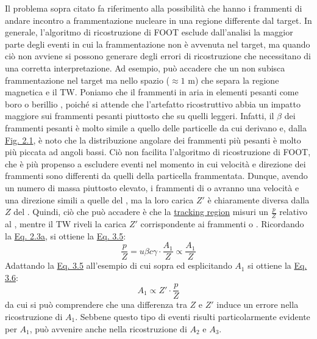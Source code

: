 \documentclass[12pt,a4paper,twoside]{report}
\begin{document}
	Il problema sopra citato fa riferimento alla possibilità che hanno i frammenti di andare incontro a frammentazione nucleare in una regione differente dal target. In generale, l'algoritmo di ricostruzione di FOOT esclude dall'analisi la maggior parte degli eventi in cui la frammentazione non è avvenuta nel target, ma quando ciò non avviene si possono generare degli errori di ricostruzione che necessitano di una corretta interpretazione. Ad esempio, può accadere che un  non subisca frammentazione nel target ma nello spazio ($\approx1\mbox{ m}$) che separa la regione magnetica e il TW. Poniamo che il  frammenti in aria in elementi pesanti come boro  o berillio , poiché si attende che l'artefatto ricostruttivo abbia un impatto maggiore sui frammenti pesanti piuttosto che su quelli leggeri. Infatti, il $\beta$ dei frammenti pesanti è molto simile a quello delle particelle da cui derivano e, dalla \hyperref[fig:angular]{Fig. 2.1}, è noto che la distribuzione angolare dei frammenti più pesanti è molto più piccata ad angoli bassi. Ciò non facilita l'algoritmo di ricostruzione di FOOT, che è più propenso a escludere eventi nel momento in cui velocità e direzione dei frammenti sono differenti da quelli della particella frammentata. Dunque, avendo un numero di massa piuttosto elevato, i frammenti di  o  avranno una velocità e una direzione simili a quelle del , ma la loro carica $Z'$ è chiaramente diversa dalla $Z$ del . Quindi, ciò che può accadere è che la \hyperref[par:tracking_region]{tracking region} misuri un $\frac{p}{Z}$ relativo al , mentre il TW riveli la carica $Z'$ corrispondente ai frammenti  o . Ricordando la \hyperref[eq:a1]{Eq. 2.3a}, si ottiene la \hyperref[eq:error_reconstruction]{Eq. 3.5}:
	\begin{equation}
		\frac{p}{Z}=u\beta c\gamma\cdot \frac{A_1}{Z}\propto\frac{A_1}{Z}
		\label{eq:error_reconstruction}
	\end{equation}
	Adattando la \hyperref[eq:error_reconstruction]{Eq. 3.5} all'esempio di cui sopra ed esplicitando $A_1$ si ottiene la \hyperref[eq:error_reconstruction_final]{Eq. 3.6}:
	\begin{equation}
		A_1\propto Z'\cdot\frac{p}{Z}
		\label{eq:error_reconstruction_final}
	\end{equation}
	da cui si può comprendere che una differenza tra $Z$ e $Z'$ induce un errore nella ricostruzione di $A_1$. Sebbene questo tipo di eventi risulti particolarmente evidente per $A_1$, può avvenire anche nella ricostruzione di $A_2$ e $A_3$.
\end{document}
